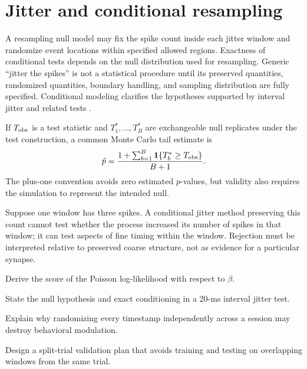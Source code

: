 \section{Jitter and conditional resampling}
A resampling null model may fix the spike count inside each jitter window and randomize event locations within specified allowed regions. Exactness of conditional tests depends on the null distribution used for resampling. Generic ``jitter the spikes'' is not a statistical procedure until its preserved quantities, randomized quantities, boundary handling, and sampling distribution are fully specified. Conditional modeling clarifies the hypotheses supported by interval jitter and related tests \cite{Amarasingham2012}.

If $T_{\rm obs}$ is a test statistic and $T_1^*,\ldots,T_B^*$ are exchangeable null replicates under the test construction, a common Monte Carlo tail estimate is
\[\hat p=\frac{1+\sum_{b=1}^B\mathbf1\{T_b^*\ge T_{\rm obs}\}}{B+1}.\]
The plus-one convention avoids zero estimated $p$-values, but validity also requires the simulation to represent the intended null.

\begin{workedexample}
Suppose one window has three spikes. A conditional jitter method preserving this count cannot test whether the process increased its number of spikes in that window; it can test aspects of fine timing within the window. Rejection must be interpreted relative to preserved coarse structure, not as evidence for a particular synapse.
\end{workedexample}
\begin{exercises}
\item Derive the score of the Poisson log-likelihood with respect to $\beta$.
\item State the null hypothesis and exact conditioning in a 20-ms interval jitter test.
\item Explain why randomizing every timestamp independently across a session may destroy behavioral modulation.
\item Design a split-trial validation plan that avoids training and testing on overlapping windows from the same trial.
\end{exercises}
